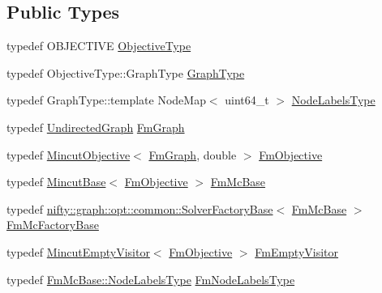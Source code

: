 \subsection*{Public Types}
\begin{DoxyCompactItemize}
\item 
typedef O\+B\+J\+E\+C\+T\+I\+VE \hyperlink{classnifty_1_1graph_1_1opt_1_1mincut_1_1MincutCcFusionMove_aa01f8621f491c8f77e106950d7525c37}{Objective\+Type}
\item 
typedef Objective\+Type\+::\+Graph\+Type \hyperlink{classnifty_1_1graph_1_1opt_1_1mincut_1_1MincutCcFusionMove_aac01d4c3a458b6c5b324e23d256e3e9f}{Graph\+Type}
\item 
typedef Graph\+Type\+::template Node\+Map$<$ uint64\+\_\+t $>$ \hyperlink{classnifty_1_1graph_1_1opt_1_1mincut_1_1MincutCcFusionMove_a287ede2c2403264860e0a227cf77f927}{Node\+Labels\+Type}
\item 
typedef \hyperlink{classnifty_1_1graph_1_1UndirectedGraph}{Undirected\+Graph} \hyperlink{classnifty_1_1graph_1_1opt_1_1mincut_1_1MincutCcFusionMove_a5ae3c9a6e16601c6de022f74b7600a2d}{Fm\+Graph}
\item 
typedef \hyperlink{classnifty_1_1graph_1_1opt_1_1mincut_1_1MincutObjective}{Mincut\+Objective}$<$ \hyperlink{classnifty_1_1graph_1_1opt_1_1mincut_1_1MincutCcFusionMove_a5ae3c9a6e16601c6de022f74b7600a2d}{Fm\+Graph}, double $>$ \hyperlink{classnifty_1_1graph_1_1opt_1_1mincut_1_1MincutCcFusionMove_a5f30047aa697335e354346a6c1c2f8ad}{Fm\+Objective}
\item 
typedef \hyperlink{classnifty_1_1graph_1_1opt_1_1mincut_1_1MincutBase}{Mincut\+Base}$<$ \hyperlink{classnifty_1_1graph_1_1opt_1_1mincut_1_1MincutCcFusionMove_a5f30047aa697335e354346a6c1c2f8ad}{Fm\+Objective} $>$ \hyperlink{classnifty_1_1graph_1_1opt_1_1mincut_1_1MincutCcFusionMove_a549fea9f9966d8fd033328c33c5bc7cd}{Fm\+Mc\+Base}
\item 
typedef \hyperlink{classnifty_1_1graph_1_1opt_1_1common_1_1SolverFactoryBase}{nifty\+::graph\+::opt\+::common\+::\+Solver\+Factory\+Base}$<$ \hyperlink{classnifty_1_1graph_1_1opt_1_1mincut_1_1MincutCcFusionMove_a549fea9f9966d8fd033328c33c5bc7cd}{Fm\+Mc\+Base} $>$ \hyperlink{classnifty_1_1graph_1_1opt_1_1mincut_1_1MincutCcFusionMove_a822ef330a0baebfd30f7690afd5cd4ff}{Fm\+Mc\+Factory\+Base}
\item 
typedef \hyperlink{namespacenifty_1_1graph_1_1opt_1_1mincut_abaeb42be72a153c73386cda5564721b2}{Mincut\+Empty\+Visitor}$<$ \hyperlink{classnifty_1_1graph_1_1opt_1_1mincut_1_1MincutCcFusionMove_a5f30047aa697335e354346a6c1c2f8ad}{Fm\+Objective} $>$ \hyperlink{classnifty_1_1graph_1_1opt_1_1mincut_1_1MincutCcFusionMove_a0157a84ec61e81ebdff1fb64515201d0}{Fm\+Empty\+Visitor}
\item 
typedef \hyperlink{classnifty_1_1graph_1_1opt_1_1common_1_1SolverBase_abefd51561de2fd009f6bed6bef6009ea}{Fm\+Mc\+Base\+::\+Node\+Labels\+Type} \hyperlink{classnifty_1_1graph_1_1opt_1_1mincut_1_1MincutCcFusionMove_a5c134293142d4aa780bf5318b224efe9}{Fm\+Node\+Labels\+Type}
\end{DoxyCompactItemize}
